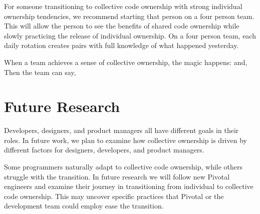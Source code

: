 
For someone transitioning to collective code ownership with strong individual ownership tendencies, we recommend starting that person on a four person team. This will allow the person to see the benefits of shared code ownership while slowly practicing the release of individual ownership. On a four person team, each daily rotation creates pairs with full knowledge of what happened yesterday.  

When a team achieves a sense of collective ownership, the magic happens:  and,  Then the team can say, 



\section{Future Research}
Developers, designers, and product managers all have different goals in their roles. In future work, we plan to examine how collective ownership is driven by different factors for designers, developers, and product managers.

Some programmers naturally adapt to collective code ownership, while others struggle with the transition. In future research we will follow new Pivotal engineers and examine their journey in transitioning from individual to collective code ownership. This may uncover specific practices that Pivotal or the development team could employ ease the transition. 


